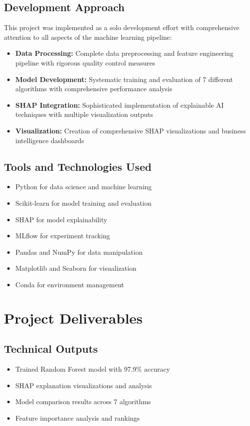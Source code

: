 \documentclass{article}
\begin{document}
\subsection{Development Approach}
This project was implemented as a solo development effort with comprehensive attention to all aspects of the machine learning pipeline:

\begin{itemize}
    \item \textbf{Data Processing:} Complete data preprocessing and feature engineering pipeline with rigorous quality control measures
    \item \textbf{Model Development:} Systematic training and evaluation of 7 different algorithms with comprehensive performance analysis
    \item \textbf{SHAP Integration:} Sophisticated implementation of explainable AI techniques with multiple visualization outputs
    \item \textbf{Visualization:} Creation of comprehensive SHAP visualizations and business intelligence dashboards
\end{itemize}

\subsection{Tools and Technologies Used}
\begin{itemize}
    \item Python for data science and machine learning
    \item Scikit-learn for model training and evaluation
    \item SHAP for model explainability
    \item MLflow for experiment tracking
    \item Pandas and NumPy for data manipulation
    \item Matplotlib and Seaborn for visualization
    \item Conda for environment management
\end{itemize}

\section{Project Deliverables}

\subsection{Technical Outputs}
\begin{itemize}
    \item Trained Random Forest model with 97.9\% accuracy
    \item SHAP explanation visualizations and analysis
    \item Model comparison results across 7 algorithms
    \item Feature importance analysis and rankings
\end{itemize}
\end{document}
